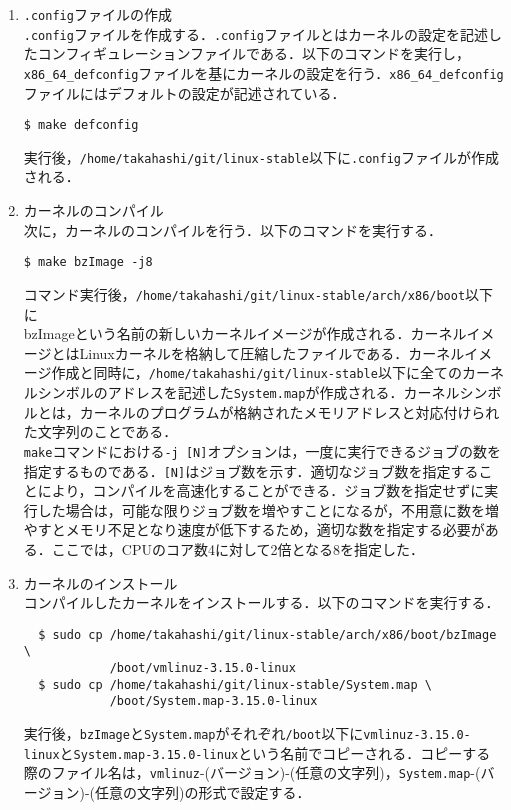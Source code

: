 \documentclass[12pt]{jsarticle}
\begin{document}
\begin{enumerate}
\item \verb|.config|ファイルの作成 \\
\verb|.config|ファイルを作成する．\verb|.config|ファイルとはカーネルの設定を記述したコンフィギュレーションファイルである．以下のコマンドを実行し，\verb|x86_64_defconfig|ファイルを基にカーネルの設定を行う．\verb|x86_64_defconfig|ファイルにはデフォルトの設定が記述されている．

\begin{verbatim}
$ make defconfig
\end{verbatim}
実行後，\verb|/home/takahashi/git/linux-stable|以下に\verb|.config|ファイルが作成される．

\item カーネルのコンパイル \\
次に，カーネルのコンパイルを行う．以下のコマンドを実行する．
  
\begin{verbatim}
$ make bzImage -j8
\end{verbatim}
コマンド実行後，\verb|/home/takahashi/git/linux-stable/arch/x86/boot|以下に\\
bzImageという名前の新しいカーネルイメージが作成される．カーネルイメージとはLinuxカーネルを格納して圧縮したファイルである．カーネルイメージ作成と同時に，\verb|/home/takahashi/git/linux-stable|以下に全てのカーネルシンボルのアドレスを記述した\verb|System.map|が作成される．カーネルシンボルとは，カーネルのプログラムが格納されたメモリアドレスと対応付けられた文字列のことである．\\
\verb|make|コマンドにおける\verb|-j [N]|オプションは，一度に実行できるジョブの数を指定するものである．\verb|[N]|はジョブ数を示す．適切なジョブ数を指定することにより，コンパイルを高速化することができる．ジョブ数を指定せずに実行した場合は，可能な限りジョブ数を増やすことになるが，不用意に数を増やすとメモリ不足となり速度が低下するため，適切な数を指定する必要がある．ここでは，CPUのコア数4に対して2倍となる8を指定した．

\item カーネルのインストール \\
  コンパイルしたカーネルをインストールする．以下のコマンドを実行する．
\begin{verbatim}
  $ sudo cp /home/takahashi/git/linux-stable/arch/x86/boot/bzImage \
            /boot/vmlinuz-3.15.0-linux
  $ sudo cp /home/takahashi/git/linux-stable/System.map \
            /boot/System.map-3.15.0-linux
\end{verbatim}
実行後，\verb|bzImage|と\verb|System.map|がそれぞれ\verb|/boot|以下に\verb|vmlinuz-3.15.0-linux|と\verb|System.map-3.15.0-linux|という名前でコピーされる．コピーする際のファイル名は，\verb|vmlinuz|-(バージョン)-(任意の文字列)，\verb|System.map|-(バージョン)-(任意の文字列)の形式で設定する．


\end{enumerate}
\end{document}
